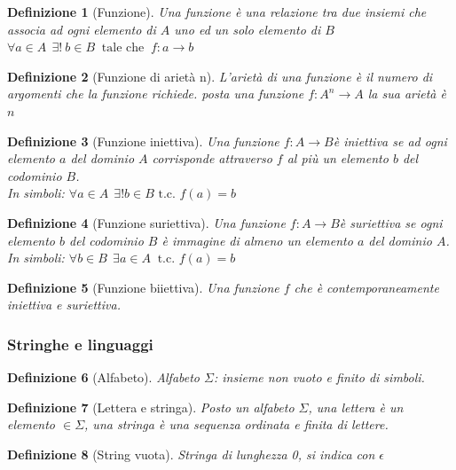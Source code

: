 \documentclass[a4paper]{article}
\newtheorem*{definition}{Definizione}
\begin{document}
\begin{definition}[Funzione]Una funzione è una relazione tra due insiemi che associa ad ogni elemento di $A$ uno ed un solo elemento di $B$\\
	$\forall a \in A \ \ \exists  ! \ b \in B \ \mbox{ tale che } \ f:a\to b$
\end{definition}
\begin{definition}[Funzione  di arietà n]L'arietà di una funzione è il numero di argomenti che la funzione richiede. posta una funzione $f : A^{n} \rightarrow A$ la sua arietà è $n$ 
\end{definition}
\begin{definition}[Funzione iniettiva]Una funzione $f : A \rightarrow B $è iniettiva se ad ogni elemento $a$ del dominio $A$ corrisponde attraverso $f$ al più un elemento $b$ del codominio $B$.\\
In simboli: $\forall a\in A\ \ \exists! b\in B \mbox{ t.c. }f(a)=b$
\end{definition}
\begin{definition}[Funzione suriettiva]Una funzione $f : A \rightarrow B $è suriettiva se ogni elemento $b$ del codominio $B$ è immagine di almeno un elemento $a$ del dominio $A$.\\
In simboli: $\forall b\in B\ \ \exists a\in A\ \mbox{ t.c. }f(a)=b$
\end{definition}
\begin{definition}[Funzione biiettiva]Una funzione $f$ che è contemporaneamente iniettiva e suriettiva.
\end{definition}

\subsubsection{Stringhe e linguaggi}

\begin{definition}[Alfabeto]Alfabeto $\Sigma$: insieme non vuoto e finito di simboli.
\end{definition}

\begin{definition}[Lettera e stringa]Posto un alfabeto $\Sigma$, una lettera è un elemento $\in \Sigma$, una stringa è una sequenza ordinata e finita di lettere.
\end{definition}

\begin{definition}[String vuota]Stringa di lunghezza 0, si indica con $\epsilon$
\end{definition}
\end{document}
